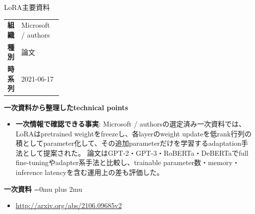 \begin{technicalnote}{LoRA}{主要資料}
\begingroup
\begin{tabularx}{\linewidth}{@{}>{\bfseries}p{0.22\linewidth}X@{}}
組織 & Microsoft / authors \\
種別 & 論文 \\
時系列 & 2021-06-17 \\
\end{tabularx}
\smallskip
\begin{minipage}{\linewidth}
{\bfseries 一次資料から整理したtechnical points}
\begin{itemize}[leftmargin=1.5em,itemsep=0.35em]
\item \textbf{一次情報で確認できる事実}: Microsoft / authorsの選定済み一次資料では、LoRAはpretrained weightをfreezeし、各layerのweight updateを低rank行列の積としてparameter化して、その追加parameterだけを学習するadaptation手法として提案された。 論文はGPT-2・GPT-3・RoBERTa・DeBERTaでfull fine-tuningやadapter系手法と比較し、trainable parameter数・memory・inference latencyを含む運用上の差も評価した。
\end{itemize}
\begin{minipage}{\linewidth}
\begin{samepage}
{\bfseries 一次資料}
\begingroup\sloppy
\Urlmuskip=0mu plus 2mu\relax
\begin{itemize}[leftmargin=1.5em,itemsep=0.25em]
\item {\scriptsize\url{http://arxiv.org/abs/2106.09685v2}}
\end{itemize}
\endgroup
\end{samepage}
\end{minipage}
\end{minipage}
\endgroup
\end{technicalnote}
\medskip
